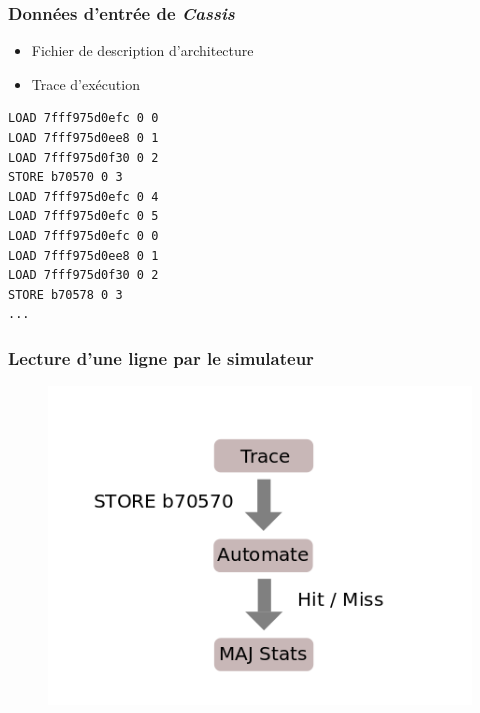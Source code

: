 \begin{frame}[fragile]
  \frametitle{Données d'entrée de \emph{Cassis}}
  
  
  \begin{itemize}
    \item Fichier de description d'architecture
    \item Trace d'exécution
  \end{itemize}
  
\begin{verbatim}
LOAD 7fff975d0efc 0 0
LOAD 7fff975d0ee8 0 1
LOAD 7fff975d0f30 0 2
STORE b70570 0 3
LOAD 7fff975d0efc 0 4
LOAD 7fff975d0efc 0 5
LOAD 7fff975d0efc 0 0
LOAD 7fff975d0ee8 0 1
LOAD 7fff975d0f30 0 2
STORE b70578 0 3
...
\end{verbatim}

\end{frame}

\begin{frame}
  \frametitle{Lecture d'une ligne par le simulateur}
  
  \begin{figure}[h!]
    \includegraphics[width=.8\textwidth]{images/cassis_deroulement.png}
  \end{figure}
  
\end{frame}

